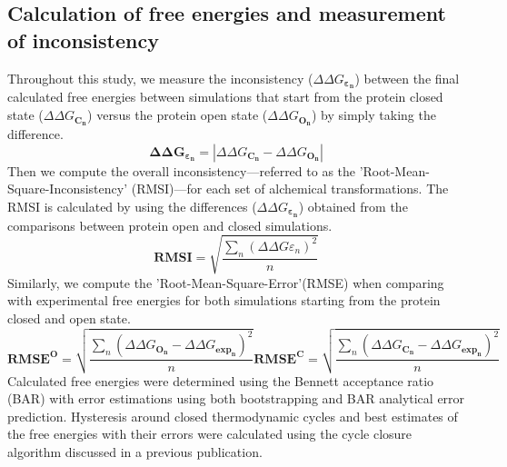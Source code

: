 \documentclass[journal=jctcce,manuscript=article]{achemso}
\begin{document}
\subsection*{Calculation of free energies and measurement of inconsistency}
Throughout this study, we measure the inconsistency ($\Delta\Delta G_{\boldsymbol{\varepsilon_n}}$) between the final calculated free energies between simulations that start from the protein closed state ($\Delta\Delta G_{\mathbf{C_n}}$) versus the protein open state ($\Delta\Delta G_{\mathbf{O_n}}$) by simply taking the difference.
\begin{equation}
  \mathbf{\Delta\Delta G_{\boldsymbol{\varepsilon_n}}}  = \left |  \Delta\Delta G_{\mathbf{C_n}  } - \Delta\Delta G_{\mathbf{O_n} }\right | 
  \label{eqn:diffG}
\end{equation}
Then we compute the overall inconsistency---referred to as the 'Root-Mean-Square-Inconsistency' (RMSI)---for each set of alchemical transformations.
The RMSI is calculated by using the differences ($\Delta\Delta G_{\boldsymbol{\varepsilon_n}}$) obtained from the comparisons between protein open and closed simulations.
\begin{equation}
\mathbf{RMSI} = \sqrt{   \frac{ \sum_{n} (\Delta\Delta G\varepsilon_{n} )^2  } {n}}
  \label{eqn:RMSI}
\end{equation}
Similarly, we compute the 'Root-Mean-Square-Error'(RMSE) when comparing with experimental free energies for both simulations starting from the protein closed and open state.
\begin{equation}
\mathbf{RMSE^{O}} = \sqrt{   \frac{ \sum_{n} (\Delta\Delta G_{\mathbf{O_n}} - \Delta\Delta G_{\mathbf{exp_n}} )^2  } {n}}
\mathbf{RMSE^{C}} = \sqrt{   \frac{ \sum_{n} (\Delta\Delta G_{\mathbf{C_n}} - \Delta\Delta G_{\mathbf{exp_n}} )^2  } {n}}
  \label{eqn:RMSE}
\end{equation}
Calculated free energies were determined using the Bennett acceptance ratio\cite{BAR} (BAR) with error estimations using both bootstrapping and BAR analytical error prediction\cite{BARerror}.
Hysteresis around closed thermodynamic cycles and best estimates of the free energies with their errors were calculated using the cycle closure algorithm discussed in a previous publication\cite{FEP/REST}.
\end{document}
